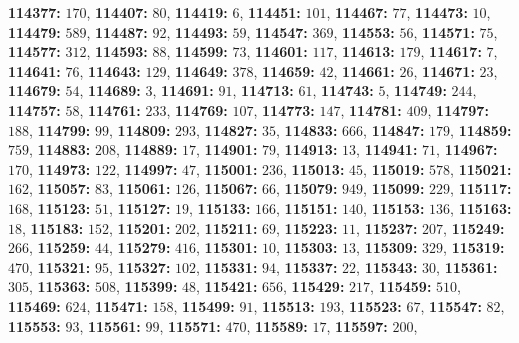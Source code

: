 \textsf{\bfseries 114377:} $170$, \textsf{\bfseries 114407:} $80$, \textsf{\bfseries 114419:} $6$, \textsf{\bfseries 114451:} $101$, \textsf{\bfseries 114467:} $77$, \textsf{\bfseries 114473:} $10$, \textsf{\bfseries 114479:} $589$, \textsf{\bfseries 114487:} $92$, \textsf{\bfseries 114493:} $59$, \textsf{\bfseries 114547:} $369$, \textsf{\bfseries 114553:} $56$, \textsf{\bfseries 114571:} $75$, \textsf{\bfseries 114577:} $312$, \textsf{\bfseries 114593:} $88$, \textsf{\bfseries 114599:} $73$, \textsf{\bfseries 114601:} $117$, \textsf{\bfseries 114613:} $179$, \textsf{\bfseries 114617:} $7$, \textsf{\bfseries 114641:} $76$, \textsf{\bfseries 114643:} $129$, \textsf{\bfseries 114649:} $378$, \textsf{\bfseries 114659:} $42$, \textsf{\bfseries 114661:} $26$, \textsf{\bfseries 114671:} $23$, \textsf{\bfseries 114679:} $54$, \textsf{\bfseries 114689:} $3$, \textsf{\bfseries 114691:} $91$, \textsf{\bfseries 114713:} $61$, \textsf{\bfseries 114743:} $5$, \textsf{\bfseries 114749:} $244$, \textsf{\bfseries 114757:} $58$, \textsf{\bfseries 114761:} $233$, \textsf{\bfseries 114769:} $107$, \textsf{\bfseries 114773:} $147$, \textsf{\bfseries 114781:} $409$, \textsf{\bfseries 114797:} $188$, \textsf{\bfseries 114799:} $99$, \textsf{\bfseries 114809:} $293$, \textsf{\bfseries 114827:} $35$, \textsf{\bfseries 114833:} $666$, \textsf{\bfseries 114847:} $179$, \textsf{\bfseries 114859:} $759$, \textsf{\bfseries 114883:} $208$, \textsf{\bfseries 114889:} $17$, \textsf{\bfseries 114901:} $79$, \textsf{\bfseries 114913:} $13$, \textsf{\bfseries 114941:} $71$, \textsf{\bfseries 114967:} $170$, \textsf{\bfseries 114973:} $122$, \textsf{\bfseries 114997:} $47$, \textsf{\bfseries 115001:} $236$, \textsf{\bfseries 115013:} $45$, \textsf{\bfseries 115019:} $578$, \textsf{\bfseries 115021:} $162$, \textsf{\bfseries 115057:} $83$, \textsf{\bfseries 115061:} $126$, \textsf{\bfseries 115067:} $66$, \textsf{\bfseries 115079:} $949$, \textsf{\bfseries 115099:} $229$, \textsf{\bfseries 115117:} $168$, \textsf{\bfseries 115123:} $51$, \textsf{\bfseries 115127:} $19$, \textsf{\bfseries 115133:} $166$, \textsf{\bfseries 115151:} $140$, \textsf{\bfseries 115153:} $136$, \textsf{\bfseries 115163:} $18$, \textsf{\bfseries 115183:} $152$, \textsf{\bfseries 115201:} $202$, \textsf{\bfseries 115211:} $69$, \textsf{\bfseries 115223:} $11$, \textsf{\bfseries 115237:} $207$, \textsf{\bfseries 115249:} $266$, \textsf{\bfseries 115259:} $44$, \textsf{\bfseries 115279:} $416$, \textsf{\bfseries 115301:} $10$, \textsf{\bfseries 115303:} $13$, \textsf{\bfseries 115309:} $329$, \textsf{\bfseries 115319:} $470$, \textsf{\bfseries 115321:} $95$, \textsf{\bfseries 115327:} $102$, \textsf{\bfseries 115331:} $94$, \textsf{\bfseries 115337:} $22$, \textsf{\bfseries 115343:} $30$, \textsf{\bfseries 115361:} $305$, \textsf{\bfseries 115363:} $508$, \textsf{\bfseries 115399:} $48$, \textsf{\bfseries 115421:} $656$, \textsf{\bfseries 115429:} $217$, \textsf{\bfseries 115459:} $510$, \textsf{\bfseries 115469:} $624$, \textsf{\bfseries 115471:} $158$, \textsf{\bfseries 115499:} $91$, \textsf{\bfseries 115513:} $193$, \textsf{\bfseries 115523:} $67$, \textsf{\bfseries 115547:} $82$, \textsf{\bfseries 115553:} $93$, \textsf{\bfseries 115561:} $99$, \textsf{\bfseries 115571:} $470$, \textsf{\bfseries 115589:} $17$, \textsf{\bfseries 115597:} $200$, 
